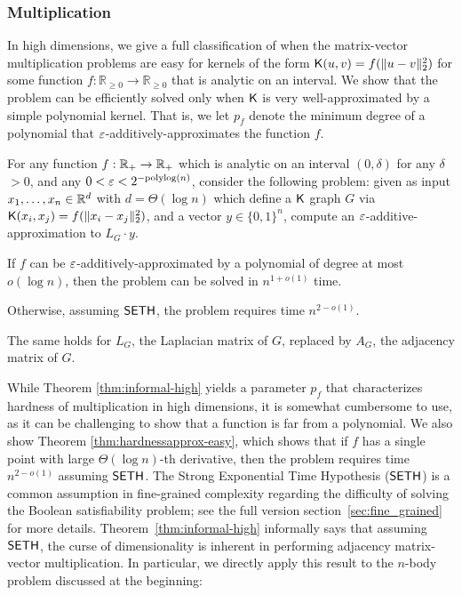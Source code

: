 \subsubsection{Multiplication} 

In high dimensions, we give a full classification of when the matrix-vector multiplication problems are easy for kernels of the form $\mathsf{K}(u,v) = f(\|u - v\|_2^2)$ for some function $f:\mathbb{R}_{\ge 0}\rightarrow \mathbb{R}_{\ge 0}$ that is analytic on an interval. We show that the problem can be efficiently solved only when $\mathsf{K}$ is very well-approximated by a simple polynomial kernel. That is, we let $p_f$ denote the minimum degree of a polynomial that $\varepsilon$-additively-approximates the function $f$.

\begin{theorem}
\label{thm:informal-high}
For any function $f : {\mathbb R}_+ \to {\mathbb R}_+$ which is analytic on an interval $(0,\delta)$ for any $\delta$ $>0$, and any $0 < \varepsilon < 2^{-\mathrm{polylog}(n)}$, consider the following problem: given as input $x_1, \ldots, x_n \in {\mathbb R}^d$ with $d = \Theta(\log n)$ which define a $\mathsf{K}$ graph $G$ via $\mathsf{K}(x_i, x_j) = f(\|x_i -x_j\|_2^2)$, and a vector $y \in \{0,1\}^n$, compute an $\varepsilon$-additive-approximation to $L_G \cdot y$. 
\begin{compactitem}
    \item If $f$ can be $\varepsilon$-additively-approximated by a polynomial of degree at most $o(\log n)$, then the problem can be solved in $n^{1+o(1)}$ time.
    \item Otherwise, assuming $\mathsf{SETH}$, the problem requires time $n^{2 - o(1)}$.
\end{compactitem}
The same holds for $L_G$, the Laplacian matrix of $G$, replaced by $A_G$, the adjacency matrix of $G$.
\end{theorem}

While Theorem \ref{thm:informal-high} yields a parameter $p_f$ that characterizes hardness of multiplication in high dimensions, it is somewhat cumbersome to use, as it can be challenging to show that a function is far from a polynomial. We also show Theorem \ref{thm:hardnessapprox-easy}, which shows that if $f$ has a single point with large $\Theta(\log n)$-th derivative, then the problem requires time $n^{2-o(1)}$ assuming $\mathsf{SETH}$. The Strong Exponential Time Hypothesis ($\mathsf{SETH}$) is a common assumption in fine-grained complexity regarding the difficulty of solving the Boolean satisfiability problem; see 
\ifdefined\isfocs
the full version
\else
section~\ref{sec:fine_grained}
\fi 
for more details. Theorem~\ref{thm:informal-high} informally says that assuming $\mathsf{SETH}$, the curse of dimensionality is inherent in performing adjacency matrix-vector multiplication. In particular, we directly apply this result to the $n$-body problem discussed at the beginning:

